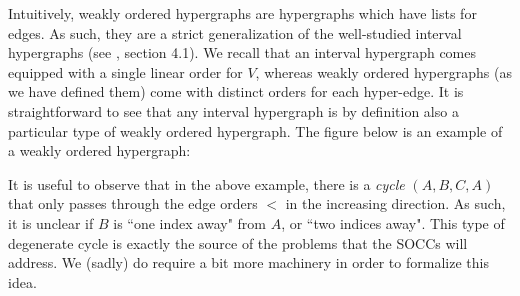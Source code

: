 \documentclass{article}
\theoremstyle{plain}
\theoremstyle{definition}
\theoremstyle{remark}
\begin{document}
Intuitively, weakly ordered hypergraphs are hypergraphs which have lists for edges. As such, they are a strict generalization of the well-studied interval hypergraphs (see \cite{HGT}, section 4.1). We recall that an interval hypergraph comes equipped with a single linear order for $V$, whereas weakly ordered hypergraphs (as we have defined them) come with distinct orders for each hyper-edge. It is straightforward to see that any interval hypergraph is by definition also a particular type of weakly ordered hypergraph. The figure below is an example of a weakly ordered hypergraph:
\vspace{0.5em}
\begin{center}
\end{center}
It is useful to observe that in the above example, there is a \textit{cycle} $(A, B, C, A)$ that only passes through the edge orders $<$ in the increasing direction. As such, it is unclear if $B$ is ``one index away" from $A$, or ``two indices away". This type of degenerate cycle is exactly the source of the problems that the SOCCs will address. We (sadly) do require a bit more machinery in order to formalize this idea.
\end{document}
